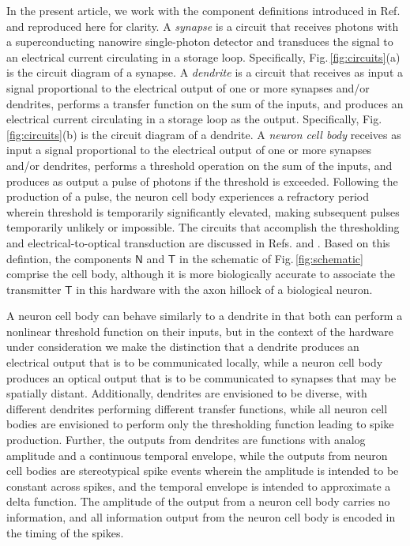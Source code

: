 \documentclass[twocolumn]{article}
\newcommand{\onlinecite}[1]{\hspace{-1 ex} \nocite{#1}\citenum{#1}}
\begin{document}
In the present article, we work with the component definitions introduced in Ref.\,\cite{sh2020} and reproduced here for clarity. A \textit{synapse} is a circuit that receives photons with a superconducting nanowire single-photon detector and transduces the signal to an electrical current circulating in a storage loop. Specifically, Fig.\,\ref{fig:circuits}(a) is the circuit diagram of a synapse. A \textit{dendrite} is a circuit that receives as input a signal proportional to the electrical output of one or more synapses and/or dendrites, performs a transfer function on the sum of the inputs, and produces an electrical current circulating in a storage loop as the output. Specifically, Fig.\,\ref{fig:circuits}(b) is the circuit diagram of a dendrite. A \textit{neuron cell body} receives as input a signal proportional to the electrical output of one or more synapses and/or dendrites, performs a threshold operation on the sum of the inputs, and produces as output a pulse of photons if the threshold is exceeded. Following the production of a pulse, the neuron cell body experiences a refractory period wherein threshold is temporarily significantly elevated, making subsequent pulses temporarily unlikely or impossible. The circuits that accomplish the thresholding and electrical-to-optical transduction are discussed in Refs.\onlinecite{sh2018} and \onlinecite{sh2018_full}. Based on this defintion, the components $\mathsf{N}$ and $\mathsf{T}$ in the schematic of Fig.\,\ref{fig:schematic} comprise the cell body, although it is more biologically accurate to associate the transmitter $\mathsf{T}$ in this hardware with the axon hillock of a biological neuron. 

A neuron cell body can behave similarly to a dendrite in that both can perform a nonlinear threshold function on their inputs, but in the context of the hardware under consideration we make the distinction that a dendrite produces an electrical output that is to be communicated locally, while a neuron cell body produces an optical output that is to be communicated to synapses that may be spatially distant. Additionally, dendrites are envisioned to be diverse, with different dendrites performing different transfer functions, while all neuron cell bodies are envisioned to perform only the thresholding function leading to spike production. Further, the outputs from dendrites are functions with analog amplitude and a continuous temporal envelope, while the outputs from neuron cell bodies are stereotypical spike events wherein the amplitude is intended to be constant across spikes, and the temporal envelope is intended to approximate a delta function. The amplitude of the output from a neuron cell body carries no information, and all information output from the neuron cell body is encoded in the timing of the spikes. 
\end{document}
